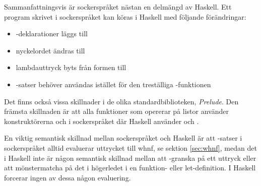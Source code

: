 \documentclass[Rapport]{subfiles}
\begin{document}
Sammanfattningsvis är sockerspråket nästan en delmängd av Haskell. Ett program
skrivet i sockerspråket kan köras i Haskell med följande förändringar:
\begin{itemize}
    \item {}-deklarationer läggs till
    \item nyckelordet  ändras till 
    \item lambdauttryck byts från formen  till 
    \item {}-satser behöver användas 
          istället för den treställiga -funktionen 
\end{itemize}
Det finns också vissa skillnader i de olika standardbiblioteken, \emph{Prelude}.
Den främsta skillnaden är att alla funktioner som opererar på listor använder 
konstruktörerna  och  i sockerspråket
där Haskell använder \ic{(:)} och \ic{[]}.

    En viktig semantisk skillnad mellan sockerspråket och Haskell är att
-satser i sockerspråket alltid evaluerar uttrycket till whnf, se
sektion \ref{sec:whnf}, medan det i Haskell inte är någon semantisk skillnad mellan att
-granska på ett uttryck eller att mönstermatcha på det i högerledet
i en funktion- eller let-definition. I Haskell forcerar ingen av dessa någon
evaluering. 

\end{document}
